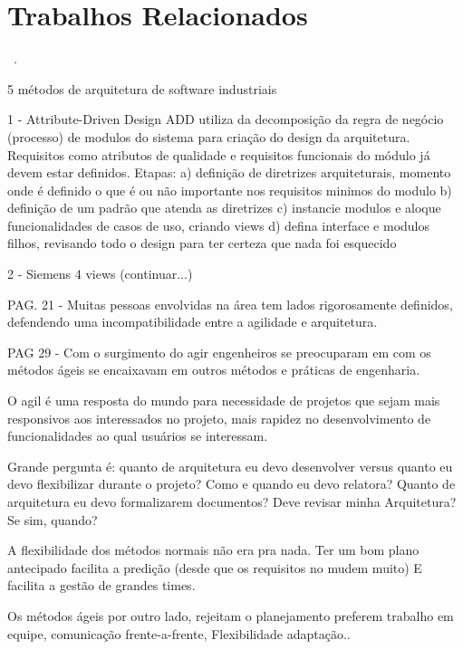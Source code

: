 \chapter{Trabalhos Relacionados}

~\cite{hofmeister2007general}.

5 métodos de arquitetura de software industriais

1 - Attribute-Driven Design
ADD utiliza da decomposição da regra de negócio (processo) de modulos do sistema para criação do design da arquitetura. Requisitos como atributos de qualidade e requisitos funcionais do módulo já devem estar definidos.
Etapas:
a) definição de diretrizes arquiteturais, momento onde é definido o que é ou não importante nos requisitos minimos do modulo
b) definição de um padrão que atenda as diretrizes
c) instancie modulos e aloque funcionalidades de casos de uso, criando views
d) defina interface e modulos filhos, revisando todo o design para ter certeza que nada foi esquecido

2 - Siemens 4 views
(continuar...)




\cite{pressman2009engenharia}


\cite{babar2013agile}

PAG. 21 - Muitas pessoas envolvidas na área tem lados rigorosamente definidos, defendendo uma incompatibilidade entre a agilidade e arquitetura. 


PAG 29 - Com o surgimento do agir engenheiros se preocuparam em com os métodos ágeis se encaixavam em outros métodos e práticas de engenharia.


O agil é uma resposta do mundo para necessidade de projetos que sejam mais responsivos aos interessados no projeto, mais rapidez no desenvolvimento de funcionalidades ao qual usuários se interessam.


Grande pergunta é: quanto de arquitetura eu devo desenvolver versus quanto eu devo flexibilizar durante o projeto? Como e quando eu devo relatora? Quanto de arquitetura eu devo formalizarem documentos? Deve revisar minha Arquitetura? Se sim, quando?


A flexibilidade dos métodos normais não era pra nada. Ter um bom plano antecipado facilita a predição (desde que os requisitos no mudem muito) E facilita a gestão de grandes times.


Os métodos ágeis por outro lado, rejeitam o planejamento preferem trabalho em 
equipe, comunicação frente-a-frente, Flexibilidade adaptação..


